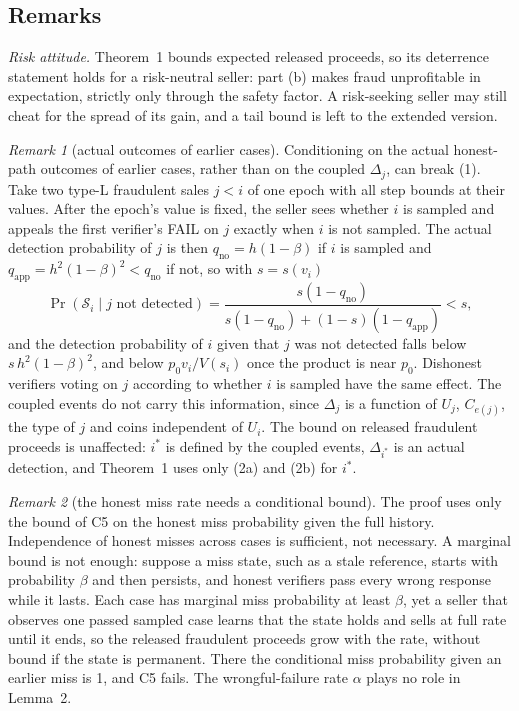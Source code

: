 \documentclass[10pt,a4paper]{article}
\newcommand{\ist}{i^{*}}
\newcommand{\cS}{\mathcal{S}}
\theoremstyle{plain}
\theoremstyle{remark}
\newtheorem{sremark}{Remark}
\begin{document}
\subsection{Remarks}

\emph{Risk attitude.} Theorem~1 bounds expected released proceeds, so its deterrence statement holds for a risk-neutral seller: part (b) makes fraud unprofitable in expectation, strictly only through the safety factor. A risk-seeking seller may still cheat for the spread of its gain, and a tail bound is left to the extended version.

\begin{sremark}[actual outcomes of earlier cases]\label{rem:actual}
Conditioning on the actual honest-path outcomes of earlier cases, rather than on the coupled $\Delta_j$, can break (1). Take two type-L fraudulent sales $j<i$ of one epoch with all step bounds at their values. After the epoch's value is fixed, the seller sees whether $i$ is sampled and appeals the first verifier's FAIL on $j$ exactly when $i$ is not sampled. The actual detection probability of $j$ is then $q_{\mathrm{no}}=h(1-\beta)$ if $i$ is sampled and $q_{\mathrm{app}}=h^2(1-\beta)^2<q_{\mathrm{no}}$ if not, so with $s=s(v_i)$
\[
\Pr(\cS_i\mid j\text{ not detected})=\frac{s(1-q_{\mathrm{no}})}{s(1-q_{\mathrm{no}})+(1-s)(1-q_{\mathrm{app}})}<s,
\]
and the detection probability of $i$ given that $j$ was not detected falls below $s\,h^2(1-\beta)^2$, and below $p_0v_i/V(s_i)$ once the product is near $p_0$. Dishonest verifiers voting on $j$ according to whether $i$ is sampled have the same effect. The coupled events do not carry this information, since $\Delta_j$ is a function of $U_j$, $C_{e(j)}$, the type of $j$ and coins independent of $U_i$. The bound on released fraudulent proceeds is unaffected: $\ist$ is defined by the coupled events, $\Delta_{\ist}$ is an actual detection, and Theorem~1 uses only (2a) and (2b) for $\ist$.
\end{sremark}

\begin{sremark}[the honest miss rate needs a conditional bound]\label{rem:beta}
The proof uses only the bound of C5 on the honest miss probability given the full history. Independence of honest misses across cases is sufficient, not necessary. A marginal bound is not enough: suppose a miss state, such as a stale reference, starts with probability $\beta$ and then persists, and honest verifiers pass every wrong response while it lasts. Each case has marginal miss probability at least $\beta$, yet a seller that observes one passed sampled case learns that the state holds and sells at full rate until it ends, so the released fraudulent proceeds grow with the rate, without bound if the state is permanent. There the conditional miss probability given an earlier miss is 1, and C5 fails. The wrongful-failure rate $\alpha$ plays no role in Lemma~2.
\end{sremark}
\end{document}
